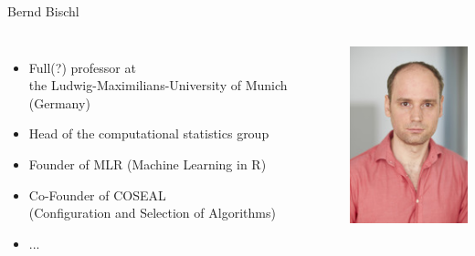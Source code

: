 \begin{frame}[c]{Bernd Bischl}


\begin{columns}
	
	
	\begin{itemize}
		\item Full(?) professor at\\ the Ludwig-Maximilians-University of Munich (Germany)
		\item Head of the computational statistics group
		\item Founder of MLR (Machine Learning in R)
		\item Co-Founder of COSEAL\\ (Configuration and Selection of Algorithms)
		\item ...
	\end{itemize}
	
	
	\includegraphics[width=1.0\textwidth]{images/bischl.jpg}
	
\end{columns}

\end{frame}
